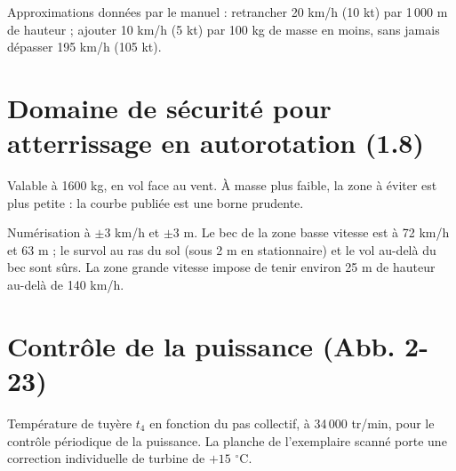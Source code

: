 \documentclass[a4paper,12pt]{article}
\renewcommand{\deg}[1]{$#1^{\circ}$}  %
\begin{document}
Approximations données par le manuel : retrancher 20 km/h (10 kt) par
1\,000 m de hauteur ; ajouter 10 km/h (5 kt) par 100 kg de masse en moins,
sans jamais dépasser 195 km/h (105 kt).

\section{Domaine de sécurité pour atterrissage en autorotation (1.8)}

Valable à 1600 kg, en vol face au vent. À masse plus faible, la zone à
éviter est plus petite : la courbe publiée est une borne prudente.

\begin{center}
\end{center}

Numérisation à $\pm 3$ km/h et $\pm 3$ m. Le bec de la zone basse vitesse
est à 72 km/h et 63 m ; le survol au ras du sol (sous 2 m en
stationnaire) et le vol au-delà du bec sont sûrs. La zone grande vitesse
impose de tenir environ 25 m de hauteur au-delà de 140 km/h.

\section{Contrôle de la puissance (Abb. 2-23)}

Température de tuyère $t_4$ en fonction du pas collectif, à
34\,000 tr/min, pour le contrôle périodique de la puissance. La planche de
l'exemplaire scanné porte une correction individuelle de turbine de
$+15$ \deg{}C.
\end{document}
